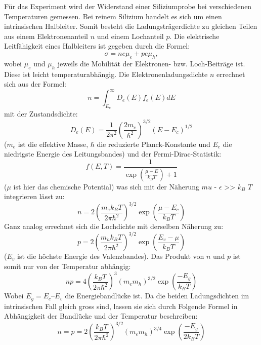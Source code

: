 \documentclass[a4paper]{scrartcl}
\begin{document}
Für das Experiment wird der Widerstand einer Siliziumprobe bei verschiedenen Temperaturen gemessen. Bei reinem Silizium handelt es sich um einen intrinsischen Halbleiter. Somit besteht die Ladungsträgerdichte zu gleichen Teilen aus einem Elektronenanteil $n$ und einem Lochanteil $p$.
Die elektrische Leitfähigkeit eines Halbleiters ist gegeben durch die Formel:
\begin{equation}
\label{eq:sigma}
\sigma = ne\mu_e + pe\mu_h,
\end{equation}
wobei $\mu_e$ und $\mu_h$ jeweils die Mobilität der Elektronen- bzw. Loch-Beiträge ist. Diese ist leicht temperaturabhängig. Die Elektronenladungsdichte $n$ errechnet sich aus der Formel: 
\begin{equation}
n = \int_{E_c}^{\infty} D_e(E) f_e(E) dE
\end{equation}
mit der Zustandsdichte:
\begin{equation}
D_e(E) = \frac{1}{2 \pi^2} \left(\frac{2 m_e}{\hbar^2}\right)^{3/2} (E - E_c)^{1/2}
\end{equation}
($m_e$ ist die effektive Masse, $\hbar$ die reduzierte Planck-Konstante und $E_c$ die niedrigste Energie des Leitungsbandes) und der Fermi-Dirac-Statistik:
\begin{equation}
f(E,T) = \frac{1}{\exp \left(\frac{\mu - E}{k_B T}\right) + 1}
\end{equation}
($\mu$ ist hier das chemische Potential) was sich mit der Näherung $mu$ - $\epsilon$ >> $k_B$ $T$ integrieren lässt zu:
\begin{equation}
n = 2 \left(\frac{m_e k_B T}{2 \pi \hbar^2}\right)^{3/2} \exp \left(\frac{\mu - E_c}{k_B T}\right)
\end{equation}
Ganz analog errechnet sich die Lochdichte mit derselben Näherung zu:
\begin{equation}
p = 2 \left(\frac{m_h k_B T}{2 \pi \hbar^2}\right)^{3/2} \exp \left(\frac{E_v - \mu}{k_B T}\right)
\end{equation}
($E_v$ ist die höchste Energie des Valenzbandes). Das Produkt von $n$ und $p$ ist somit nur von der Temperatur abhängig:
\begin{equation}
np = 4 \left(\frac{k_B T}{2 \pi \hbar^2}\right)^{3} (m_e m_h)^{3/2} \exp \left(\frac{-E_g}{k_B T}\right)
\end{equation}
Wobei $E_g = E_c – E_v$ die Energiebandlücke ist. Da die beiden Ladungsdichten im intrinsischen Fall gleich gross sind, lassen sie sich durch Folgende Formel in Abhängigkeit der Bandlücke und der Temperatur beschreiben:
\begin{equation}
n = p = 2 \left(\frac{k_B T}{2 \pi \hbar^2}\right)^{3/2} (m_e m_h)^{3/4} \exp \left(\frac{-E_g}{2 k_B T}\right)
\end{equation}
\end{document}
